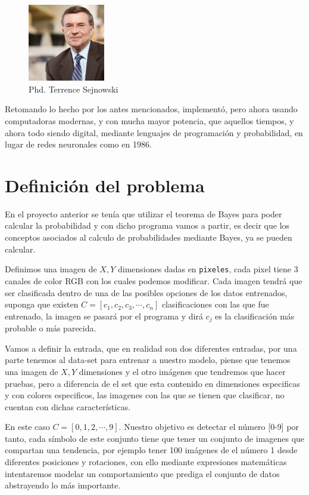 \documentclass[
  spanish,
]{article}
\begin{document}
\begin{figure}
\centering
\includegraphics[width=0.3\textwidth,height=\textheight]{img/README/terrence.jpg}
\caption{Phd. Terrence Sejnowski}
\end{figure}

Retomando lo hecho por los antes mencionados, implementó, pero ahora
usando computadoras modernas, y con mucha mayor potencia, que aquellos
tiempos, y ahora todo siendo digital, mediante lenguajes de programación
y probabilidad, en lugar de redes neuronales como en 1986.

\hypertarget{definiciuxf3n-del-problema}{%
\section{Definición del problema}\label{definiciuxf3n-del-problema}}

En el proyecto anterior se tenía que utilizar el teorema de Bayes para
poder calcular la probabilidad y con dicho programa vamos a partir, es
decir que los conceptos asociados al calculo de probabilidades mediante
Bayes, ya se pueden calcular.

Definimos una imagen de \(X,Y\) dimensiones dadas en \texttt{pixeles},
cada pixel tiene 3 canales de color RGB con los cuales podemos
modificar. Cada imagen tendrá que ser clasificada dentro de una de las
posibles opciones de los datos entrenados, suponga que existen
\(C=[c_1,c_2,c_3, \cdots,c_n]\) clasificaciones con las que fue
entrenado, la imagen se pasará por el programa y dirá \(c_j\) es la
clasificación más probable o más parecida.

Vamos a definir la entrada, que en realidad son dos diferentes entradas,
por una parte tenemos al data-set para entrenar a nuestro modelo, piense
que tenemos una imagen de \(X,Y\) dimensiones y el otro imágenes que
tendremos que hacer pruebas, pero a diferencia de el set que esta
contenido en dimensiones especificas y con colores especificos, las
imagenes con las que se tienen que clasificar, no cuentan con dichas
características.

En este caso \(C=[0,1,2, \cdots,9]\)\hspace{0pt}. Nuestro objetivo es
detectar el número {[}0-9{]} por tanto, cada símbolo de este conjunto
tiene que tener un conjunto de imagenes que compartan una tendencia, por
ejemplo tener 100 imágenes de el número 1 desde diferentes posiciones y
rotaciones, con ello mediante expresiones matemáticas intentaremos
modelar un comportamiento que prediga el conjunto de datos abstrayendo
lo más importante.
\end{document}
